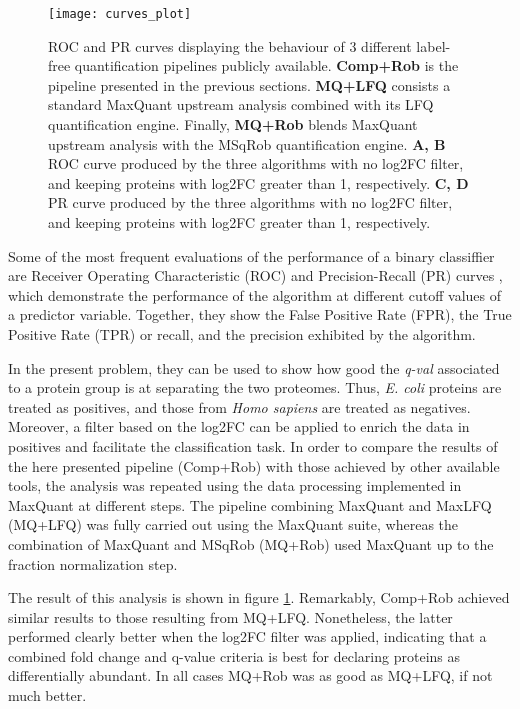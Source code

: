 \begin{figure}[H]
\centering
\texttt{[image: curves\_plot]}
\caption[Classifier evaluation: ROC and PR curves]{ROC and PR curves displaying the behaviour of 3 different label-free quantification pipelines publicly available. \textbf{Comp+Rob} is the pipeline presented in the previous sections. \textbf{MQ+LFQ} consists a standard MaxQuant upstream analysis combined with its LFQ quantification engine. Finally, \textbf{MQ+Rob} blends MaxQuant upstream analysis with the MSqRob quantification engine. \textbf{A, B} ROC curve produced by the three algorithms with no \ac{log2FC} filter, and keeping proteins with \ac{log2FC} greater than 1, respectively. \textbf{C, D} PR curve produced by the three algorithms with no \ac{log2FC} filter, and keeping proteins with \ac{log2FC} greater than 1, respectively.}
\label{fig:roc_curves}
\end{figure}


Some of the most frequent evaluations of the performance of a binary classiffier are Receiver Operating Characteristic (ROC) and Precision-Recall (PR) curves \cite{Bradley1997}, which demonstrate the performance of the algorithm at different cutoff values of a predictor variable. Together, they show the False Positive Rate (FPR), the True Positive Rate (TPR) or recall, and the precision exhibited by the algorithm.




In the present problem, they can be used to show how good the \textit{q-val} associated to a protein group is at separating the two proteomes. Thus, \textit{E. coli} proteins are treated as positives, and those from \textit{Homo sapiens} are treated as negatives. Moreover, a filter based on the \ac{log2FC} can be applied to enrich the data in positives and facilitate the classification task.
In order to compare the results of the here presented pipeline (Comp+Rob) with those achieved by other available tools, the analysis was repeated using the data processing implemented in MaxQuant \cite{Cox2008} at different steps. The pipeline combining MaxQuant and MaxLFQ (MQ+LFQ) was fully carried out using the MaxQuant suite, whereas the combination of MaxQuant and MSqRob (MQ+Rob) used MaxQuant up to the fraction normalization step.

The result of this analysis is shown in figure \ref{fig:roc_curves}. Remarkably, Comp+Rob achieved similar results to those resulting from MQ+LFQ. Nonetheless, the latter performed clearly better when the \ac{log2FC} filter was applied, indicating that a combined fold change and q-value criteria is best for declaring proteins as differentially abundant. In all cases MQ+Rob was as good as MQ+LFQ, if not much better.


